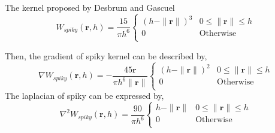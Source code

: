     The kernel proposed by Desbrum and Gascuel\cite{desbrun1996smoothed}
    \begin{equation}
        W_{spiky}(\textbf{r}, h) = \frac{15}{\pi h^6}
            \begin{cases}
                (h - \|\textbf{r}\|)^3 & 0\le\|\textbf{r}\|\le h \\
                0 & \textrm{Otherwise}\\
            \end{cases}
    \end{equation}

    Then, the gradient of spiky kernel can be described by,
    \begin{equation}
        \nabla W_{spiky}(\textbf{r}, h) = -\frac{45 \textbf{r}}{\pi h^6 \|\textbf{r}\|}
            \begin{cases}
                (h - \|\textbf{r}\|)^2 & 0\le\|\textbf{r}\|\le h \\
                0 & \textrm{Otherwise}\\
            \end{cases}
    \end{equation}
     The laplacian of spiky can be expressed by,
     \begin{equation}
        \nabla^2 W_{spiky}(\textbf{r}, h) = \frac{90}{\pi h^6}
            \begin{cases}
                h - \| \textbf{r} \| & 0 \le \| \textbf{r} \| \le h \\
                0 & \textrm{Otherwise}\\
            \end{cases}
    \end{equation}

